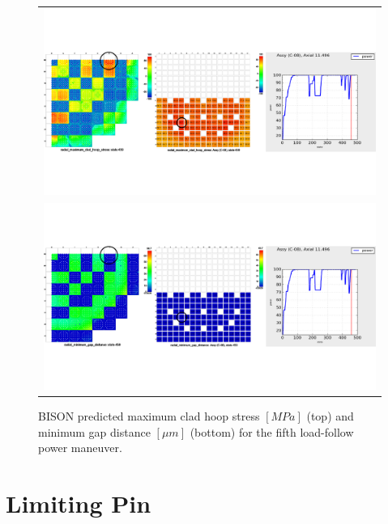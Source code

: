 \documentclass[edeposit,fullpage,11pt]{uiucthesis2009}
\begin{document}
\begin{landscape}
\begin{figure}[h]
\begin{tabular}{c}
\includegraphics[trim={0 4cm 0 4cm},clip,width=\linewidth]{./Figures/bison_res/PR5_MCHS.pdf} \\
\includegraphics[trim={0 4cm 0 4cm},clip,width=\linewidth]{./Figures/bison_res/PR5_MGD.pdf} \\
\end{tabular}
\caption{BISON predicted maximum clad hoop stress $[MPa]$ (top) and minimum gap distance $[ \mu m]$ (bottom) for the fifth load-follow power maneuver.}
\label{fig:bison_PR5}
\end{figure}
\end{landscape}


\section{Limiting Pin}
\end{document}
